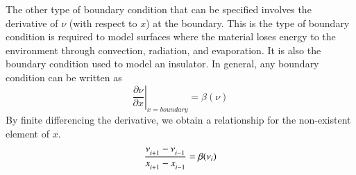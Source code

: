 \documentclass[letterpaper,12pt]{article}
\begin{document}
The other type of boundary condition that can be specified involves the
derivative of $\nu$ (with respect to $x$) at the boundary. This is the type of
boundary condition is required to model surfaces where the material loses energy
to the environment through convection, radiation, and evaporation. It is also
the boundary condition used to model an insulator.  In general, any boundary
condition can be written as
\begin{equation}
  \left. \frac{\partial \nu}{\partial x} \right|_{x = boundary} = \beta(\nu)
\end{equation}
By finite differencing the derivative, we obtain a relationship for the non-existent element of $x$.
\begin{equation}
  \label{eqn:FD_BC}
  \frac{ \nu\indices{_{i+1}} - \nu\indices{_{i-1}} }{ x\indices{_{i+1}} - x\indices{_{i-1}} } = \beta(\nu_i)
\end{equation}
\end{document}

